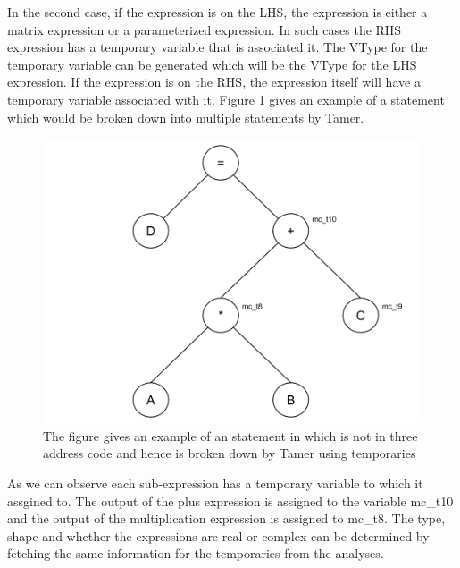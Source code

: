 In the second case, if the expression is on the LHS, the expression is either a matrix expression or a parameterized expression. In such cases the RHS expression has a temporary variable that is associated it. The VType for the temporary variable can be generated which will be the VType for the LHS expression. If the expression is on the RHS, the expression itself will have a temporary variable associated with it. Figure \ref{Fig:tac} gives an example of a statement which would be broken down into multiple statements by Tamer. 
\begin{figure}[htbp]
\begin{center}
\includegraphics[scale=0.5]{Figures/tac.png}
\caption[Statement in \matlab that is not three address code]{The figure gives an example of an statement in \matlab which is not in three address code and hence is broken down by Tamer using temporaries}
\label{Fig:tac}
\end{center}
\end{figure}
As we can observe each sub-expression has a temporary variable to which it assgined to. The output of the plus expression is assigned to the variable \textsf{mc\_t10} and the output of the multiplication expression is assigned to \textsf{mc\_t8}. The type, shape and whether the expressions are real or complex can be determined by fetching the same information for the temporaries from the analyses. 
